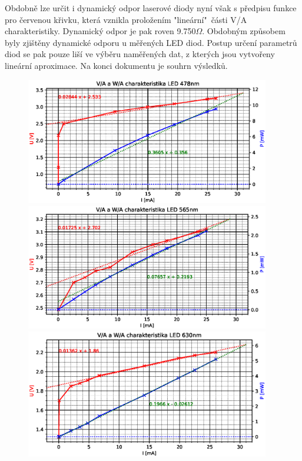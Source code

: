 \documentclass[10pt, a4paper]{article}%
\begin{document}
	Obdobně lze určit i dynamický odpor laserové diody nyní však s předpisu funkce pro červenou křivku,
	která vznikla proložením "lineární"\ části V/A charakteristiky. Dynamický odpor je pak roven
	9.750$\Omega$. Obdobným způsobem byly zjištěny dynamické odporu u měřených LED diod. Postup určení
	parametrů diod se pak pouze liší ve výběru naměřených dat, z kterých jsou vytvořeny lineární aproximace.
	Na konci dokumentu je souhrn výsledků.

	\begin{figure}[ht!]
		\centering
		\includegraphics[width = 0.95\textwidth]{LED_478nm.eps}
		\includegraphics[width = 0.95\textwidth]{LED_565nm.eps}
		\includegraphics[width = 0.95\textwidth]{LED_630nm.eps}
	\end{figure}
\end{document}
